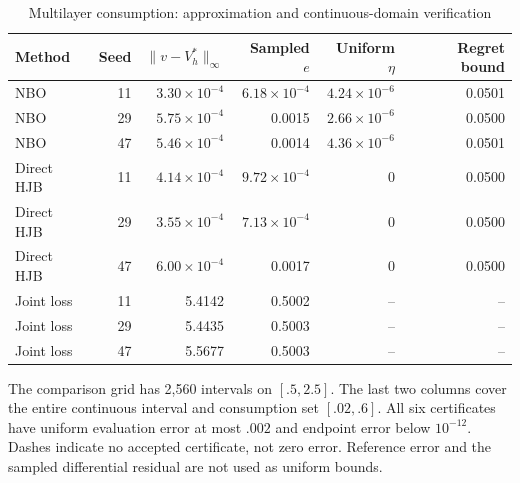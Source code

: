 \begin{table}[t]\centering
\caption{Multilayer consumption: approximation and continuous-domain verification}\label{tab:consumption-r6}
\small\begin{tabular}{lrrrrr}
\toprule
Method & Seed & $\|v-V_h^*\|_\infty$ & Sampled $e$ & Uniform $\eta$ & Regret bound\\\midrule
NBO & 11 & $3.30\times10^{-4}$ & $6.18\times10^{-4}$ & $4.24\times10^{-6}$ & 0.0501\\
NBO & 29 & $5.75\times10^{-4}$ & 0.0015 & $2.66\times10^{-6}$ & 0.0500\\
NBO & 47 & $5.46\times10^{-4}$ & 0.0014 & $4.36\times10^{-6}$ & 0.0501\\
Direct HJB & 11 & $4.14\times10^{-4}$ & $9.72\times10^{-4}$ & 0 & 0.0500\\
Direct HJB & 29 & $3.55\times10^{-4}$ & $7.13\times10^{-4}$ & 0 & 0.0500\\
Direct HJB & 47 & $6.00\times10^{-4}$ & 0.0017 & 0 & 0.0500\\
Joint loss & 11 & 5.4142 & 0.5002 & -- & --\\
Joint loss & 29 & 5.4435 & 0.5003 & -- & --\\
Joint loss & 47 & 5.5677 & 0.5003 & -- & --\\
\bottomrule\end{tabular}
\par\smallskip\footnotesize The comparison grid has 2,560 intervals on $[.5,2.5]$. The last two columns cover the entire continuous interval and consumption set $[.02,.6]$. All six certificates have uniform evaluation error at most $.002$ and endpoint error below $10^{-12}$. Dashes indicate no accepted certificate, not zero error. Reference error and the sampled differential residual are not used as uniform bounds.
\end{table}
